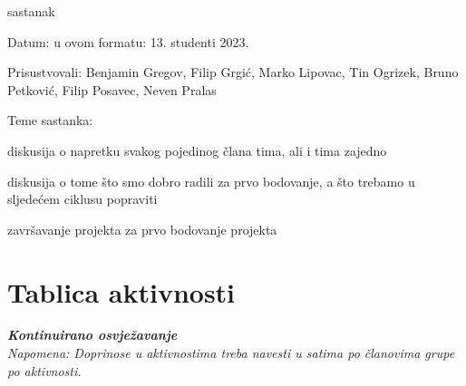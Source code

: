 \begin{packed_enum}
			\item  sastanak
			\item[] \begin{packed_item}
				\item Datum: u ovom formatu: 13. studenti 2023.
				\item Prisustvovali: Benjamin Gregov, Filip Grgić, Marko Lipovac, Tin Ogrizek, Bruno Petković, Filip Posavec, Neven Pralas
				\item Teme sastanka:
				\begin{packed_item}
					\item  diskusija o napretku svakog pojedinog člana tima, ali i tima zajedno
					\item  diskusija o tome što smo dobro radili za prvo bodovanje, a što trebamo u sljedećem ciklusu popraviti
					\item  završavanje projekta za prvo bodovanje projekta
				\end{packed_item}
			\end{packed_item}
			
			
		\end{packed_enum}
		
		\eject
		\section*{Tablica aktivnosti}
		
			\textbf{\textit{Kontinuirano osvježavanje}}\\
			
			 \textit{Napomena: Doprinose u aktivnostima treba navesti u satima po članovima grupe po aktivnosti.}


